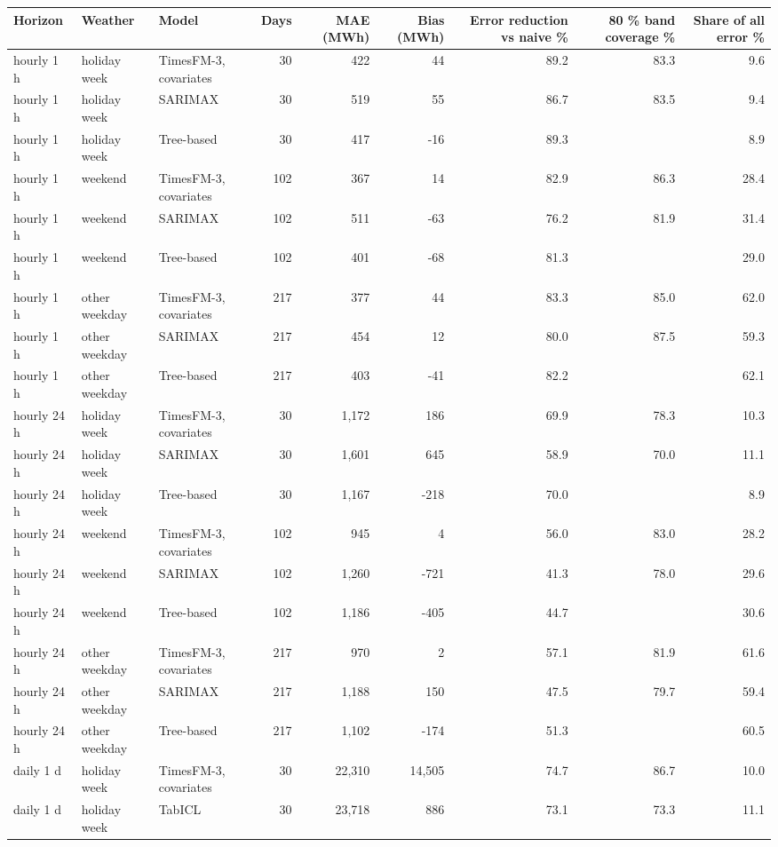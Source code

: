 \begin{tabular}{lllrrrrrr}
\toprule
Horizon & Weather & Model & Days & MAE (MWh) & Bias (MWh) & Error reduction vs naive \% & 80 \% band coverage \% & Share of all error \% \\
\midrule
hourly 1 h & holiday week & TimesFM-3, covariates & 30 & 422 & 44 & 89.2 & 83.3 & 9.6 \\
hourly 1 h & holiday week & SARIMAX & 30 & 519 & 55 & 86.7 & 83.5 & 9.4 \\
hourly 1 h & holiday week & Tree-based & 30 & 417 & -16 & 89.3 &  & 8.9 \\
hourly 1 h & weekend & TimesFM-3, covariates & 102 & 367 & 14 & 82.9 & 86.3 & 28.4 \\
hourly 1 h & weekend & SARIMAX & 102 & 511 & -63 & 76.2 & 81.9 & 31.4 \\
hourly 1 h & weekend & Tree-based & 102 & 401 & -68 & 81.3 &  & 29.0 \\
hourly 1 h & other weekday & TimesFM-3, covariates & 217 & 377 & 44 & 83.3 & 85.0 & 62.0 \\
hourly 1 h & other weekday & SARIMAX & 217 & 454 & 12 & 80.0 & 87.5 & 59.3 \\
hourly 1 h & other weekday & Tree-based & 217 & 403 & -41 & 82.2 &  & 62.1 \\
hourly 24 h & holiday week & TimesFM-3, covariates & 30 & 1,172 & 186 & 69.9 & 78.3 & 10.3 \\
hourly 24 h & holiday week & SARIMAX & 30 & 1,601 & 645 & 58.9 & 70.0 & 11.1 \\
hourly 24 h & holiday week & Tree-based & 30 & 1,167 & -218 & 70.0 &  & 8.9 \\
hourly 24 h & weekend & TimesFM-3, covariates & 102 & 945 & 4 & 56.0 & 83.0 & 28.2 \\
hourly 24 h & weekend & SARIMAX & 102 & 1,260 & -721 & 41.3 & 78.0 & 29.6 \\
hourly 24 h & weekend & Tree-based & 102 & 1,186 & -405 & 44.7 &  & 30.6 \\
hourly 24 h & other weekday & TimesFM-3, covariates & 217 & 970 & 2 & 57.1 & 81.9 & 61.6 \\
hourly 24 h & other weekday & SARIMAX & 217 & 1,188 & 150 & 47.5 & 79.7 & 59.4 \\
hourly 24 h & other weekday & Tree-based & 217 & 1,102 & -174 & 51.3 &  & 60.5 \\
daily 1 d & holiday week & TimesFM-3, covariates & 30 & 22,310 & 14,505 & 74.7 & 86.7 & 10.0 \\
daily 1 d & holiday week & TabICL & 30 & 23,718 & 886 & 73.1 & 73.3 & 11.1 \\

\end{tabular}
